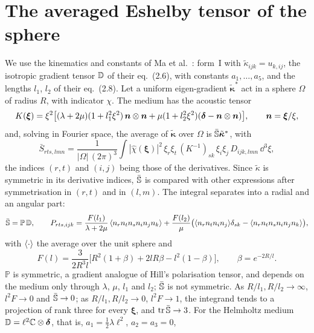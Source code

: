 \section{The averaged Eshelby tensor of the sphere}\label{app:eshelby}

We use the kinematics and constants of Ma et al.~\cite{Ma2018}: form~I with
$\tilde\kappa_{ijk}=u_{k,ij}$, the isotropic gradient tensor $\mathbb{D}$ of their eq.~(2.6), with
constants $a_1,\dots,a_5$, and the lengths $l_1$, $l_2$ of their eq.~(2.8). Let a uniform
eigen-gradient $\tilde{\bm\kappa}^*$ act in a sphere $\Omega$ of radius $R$, with indicator
$\chi$. The medium has the acoustic tensor
\begin{equation}
K(\bm\xi)=\xi^2\big[(\lambda+2\mu)(1+l_1^2\xi^2)\,\bm n\otimes\bm n
+\mu(1+l_2^2\xi^2)(\bm{\delta}-\bm n\otimes\bm n)\big],\qquad \bm n=\bm\xi/\xi,
\label{eq:esh-acoustic}
\end{equation}
and, solving in Fourier space, the average of $\tilde{\bm\kappa}$ over $\Omega$ is
$\bar{\mathbb{S}}\tilde{\bm\kappa}^*$, with
\begin{equation}
\bar S_{rts,lmn}=\frac{1}{|\Omega|\,(2\pi)^3}\int|\hat\chi(\bm\xi)|^2\,
\xi_r\xi_t\,(K^{-1})_{sk}\,\xi_i\xi_j\,D_{ijk,lmn}\,\dd^3\xi,
\label{eq:esh-fourier}
\end{equation}
the indices $(r,t)$ and $(i,j)$ being those of the derivatives. Since
$\tilde\kappa$ is symmetric in its derivative indices, $\bar{\mathbb{S}}$ is compared with other
expressions after symmetrisation in $(r,t)$ and in $(l,m)$. The integral separates into a
radial and an angular part:
\begin{equation}
\bar{\mathbb{S}}=\mathbb P\,\mathbb{D},\qquad
P_{rts,ijk}=\frac{F(l_1)}{\lambda+2\mu}\,\langle n_rn_tn_sn_in_jn_k\rangle
+\frac{F(l_2)}{\mu}\big(\langle n_rn_tn_in_j\rangle\delta_{sk}-\langle n_rn_tn_sn_in_jn_k\rangle\big),
\label{eq:esh-polarization}
\end{equation}
with $\langle \cdot\rangle$ the average over the unit sphere and
\begin{equation}
F(l)=\frac{3}{2R^3l}\big[R^2(1+\beta)+2lR\beta-l^2(1-\beta)\big],\qquad \beta=e^{-2R/l}.
\label{eq:esh-radial}
\end{equation}
$\mathbb P$ is symmetric, a gradient analogue of Hill's polarisation tensor, and depends on the
medium only through $\lambda$, $\mu$, $l_1$ and $l_2$; $\bar{\mathbb{S}}$ is not symmetric. As
$R/l_1,R/l_2\to\infty$, $l^2F\to0$ and $\bar{\mathbb{S}}\to0$; as $R/l_1,R/l_2\to0$, $l^2F\to1$, the
integrand tends to a projection of rank three for every $\bm\xi$, and $\operatorname{tr}\bar{\mathbb{S}}\to3$. For the
Helmholtz medium $\mathbb{D}=\ell^2\mathbb{C}\otimes\bm{\delta}$, that is, $a_1=\tfrac12\lambda\ell^2$, $a_2=a_3=0$,
